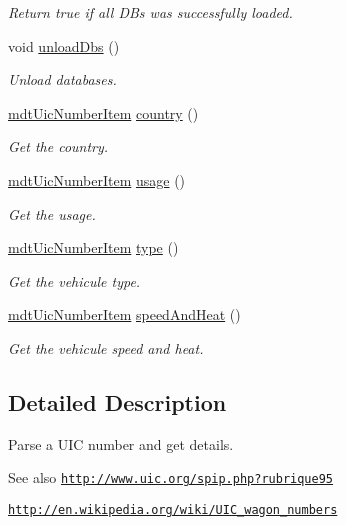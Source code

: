 \begin{DoxyCompactItemize}
\begin{DoxyCompactList}\small\item\em Return true if all DBs was successfully loaded. \end{DoxyCompactList}\item 
void \hyperlink{classmdt_uic_number_a7bb368e5de6a9e7af3a2516eb4282e04}{unloadDbs} ()
\begin{DoxyCompactList}\small\item\em Unload databases. \end{DoxyCompactList}\item 
\hyperlink{classmdt_uic_number_item}{mdtUicNumberItem} \hyperlink{classmdt_uic_number_a69fea97b67a745980ad4386d5ffa9505}{country} ()
\begin{DoxyCompactList}\small\item\em Get the country. \end{DoxyCompactList}\item 
\hyperlink{classmdt_uic_number_item}{mdtUicNumberItem} \hyperlink{classmdt_uic_number_a8e2e1c1be4425b57e0fa60113410bfbc}{usage} ()
\begin{DoxyCompactList}\small\item\em Get the usage. \end{DoxyCompactList}\item 
\hyperlink{classmdt_uic_number_item}{mdtUicNumberItem} \hyperlink{classmdt_uic_number_ae7d6500d0e939956371e152d9ca17117}{type} ()
\begin{DoxyCompactList}\small\item\em Get the vehicule type. \end{DoxyCompactList}\item 
\hyperlink{classmdt_uic_number_item}{mdtUicNumberItem} \hyperlink{classmdt_uic_number_af2c13420378ec5559ce4f1eaba1f38e7}{speedAndHeat} ()
\begin{DoxyCompactList}\small\item\em Get the vehicule speed and heat. \end{DoxyCompactList}\end{DoxyCompactItemize}


\subsection{Detailed Description}
Parse a UIC number and get details. 

\begin{DoxySeeAlso}{See also}
\href{http://www.uic.org/spip.php?rubrique95}{\tt http://www.uic.org/spip.php?rubrique95} 

\href{http://en.wikipedia.org/wiki/UIC_wagon_numbers}{\tt http://en.wikipedia.org/wiki/UIC\_\-wagon\_\-numbers} 
\end{DoxySeeAlso}


